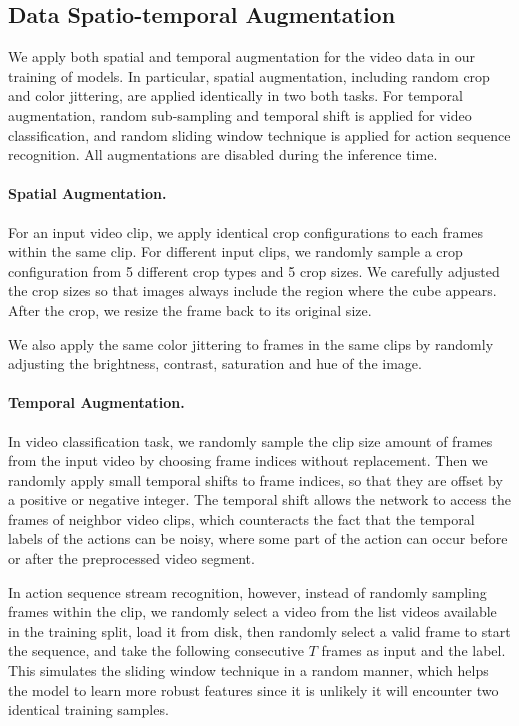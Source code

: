 \documentclass[10pt,twocolumn,letterpaper]{article}
\begin{document}

\subsection{Data Spatio-temporal Augmentation}
\label{section:data-aug}
We apply both spatial and temporal augmentation for the video data in our training of models. In particular, spatial augmentation, including random crop and color jittering, are applied identically in two both tasks. For temporal augmentation, random sub-sampling and temporal shift is applied for video classification, and random sliding window technique is applied for action sequence recognition. All augmentations are disabled during the inference time.

\paragraph{Spatial Augmentation.}
For an input video clip, we apply identical crop configurations to each frames within the same clip. For different input clips, we randomly sample a crop configuration from 5 different crop types and 5 crop sizes. We carefully adjusted the crop sizes so that images always include the region where the cube appears. After the crop, we resize the frame back to its original size. 

We also apply the same color jittering to frames in the same clips by randomly adjusting the brightness, contrast, saturation and hue of  the image.

\paragraph{Temporal Augmentation.}
In video classification task, we randomly sample the clip size amount of frames from the input video by choosing frame indices without replacement. Then we randomly apply small temporal shifts to frame indices, so that they are offset by a positive or negative integer. The temporal shift allows the network to access the frames of neighbor video clips, which counteracts the fact that the temporal labels of the actions can be noisy, where some part of the action can occur before or after the preprocessed video segment. 

In action sequence stream recognition, however, instead of randomly sampling frames within the clip, we randomly select a video from the list videos available in the training split, load it from disk, then randomly select a valid frame to start the sequence, and take the following consecutive $T$ frames as input and the label. This simulates the sliding window technique in a random manner, which helps the model to learn more robust features since it is unlikely it will encounter two identical training samples.
\end{document}
